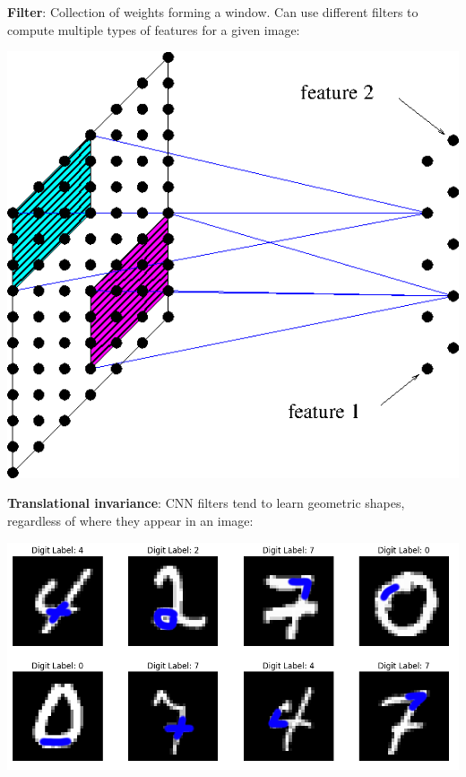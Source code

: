 \documentclass[12pt,t]{beamer}
\begin{document}
\begin{frame}

{\bf Filter}: Collection of weights forming a window.  Can use different filters to compute multiple types of features for a given image:

\centerline{
\includegraphics[height=0.4\textheight]{./images/filters.png} 
}

{\bf Translational invariance}: CNN filters tend to learn geometric shapes, regardless of where they appear in an image:

\centerline{
\includegraphics[height=0.3\textheight]{./images/convfeat.png} 
}

\end{frame}
\end{document}
